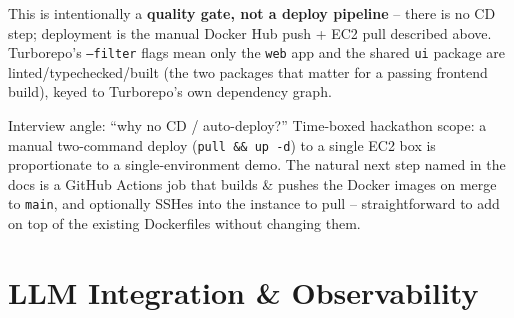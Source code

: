 \documentclass[11pt,a4paper]{article}
\begin{document}
This is intentionally a \textbf{quality gate, not a deploy pipeline} -- there is no CD step;
deployment is the manual Docker Hub push + EC2 pull described above. Turborepo's
\texttt{--filter} flags mean only the \texttt{web} app and the shared \texttt{ui} package are
linted/typechecked/built (the two packages that matter for a passing frontend build), keyed to
Turborepo's own dependency graph.

\begin{qabox}{Interview angle: ``why no CD / auto-deploy?''}
Time-boxed hackathon scope: a manual two-command deploy (\texttt{pull \&\& up -d}) to a single
EC2 box is proportionate to a single-environment demo. The natural next step named in the docs
is a GitHub Actions job that builds \& pushes the Docker images on merge to \texttt{main}, and
optionally SSHes into the instance to pull -- straightforward to add on top of the existing
Dockerfiles without changing them.
\end{qabox}

\section{LLM Integration \& Observability}
\end{document}
